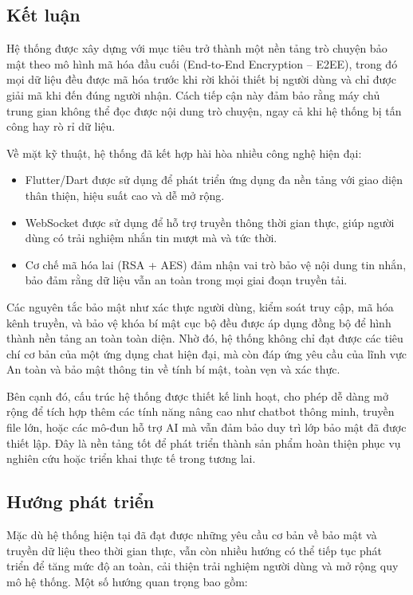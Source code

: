 \setcounter{section}{0}
\renewcommand{\thesubsection}{\arabic{subsection}.}

\subsection{Kết luận}
\hspace*{2em} Hệ thống được xây dựng với mục tiêu trở thành một nền tảng trò chuyện bảo mật theo mô hình mã hóa đầu cuối (End-to-End Encryption – E2EE), trong đó mọi dữ liệu đều được mã hóa trước khi rời khỏi thiết bị người dùng và chỉ được giải mã khi đến đúng người nhận. Cách tiếp cận này đảm bảo rằng máy chủ trung gian không thể đọc được nội dung trò chuyện, ngay cả khi hệ thống bị tấn công hay rò rỉ dữ liệu.

\indent Về mặt kỹ thuật, hệ thống đã kết hợp hài hòa nhiều công nghệ hiện đại:
\begin{itemize}
  \item Flutter/Dart được sử dụng để phát triển ứng dụng đa nền tảng với giao diện thân thiện, hiệu suất cao và dễ mở rộng.
  \item WebSocket được sử dụng để hỗ trợ truyền thông thời gian thực, giúp người dùng có trải nghiệm nhắn tin mượt mà và tức thời.
  \item Cơ chế mã hóa lai (RSA + AES) đảm nhận vai trò bảo vệ nội dung tin nhắn, bảo đảm rằng dữ liệu vẫn an toàn trong mọi giai đoạn truyền tải.

\end{itemize}

\indent Các nguyên tắc bảo mật như xác thực người dùng, kiểm soát truy cập, mã hóa kênh truyền, và bảo vệ khóa bí mật cục bộ đều được áp dụng đồng bộ để hình thành nền tảng an toàn toàn diện. Nhờ đó, hệ thống không chỉ đạt được các tiêu chí cơ bản của một ứng dụng chat hiện đại, mà còn đáp ứng yêu cầu của lĩnh vực An toàn và bảo mật thông tin về tính bí mật, toàn vẹn và xác thực.

\indent Bên cạnh đó, cấu trúc hệ thống được thiết kế linh hoạt, cho phép dễ dàng mở rộng để tích hợp thêm các tính năng nâng cao như chatbot thông minh, truyền file lớn, hoặc các mô-đun hỗ trợ AI mà vẫn đảm bảo duy trì lớp bảo mật đã được thiết lập. Đây là nền tảng tốt để phát triển thành sản phẩm hoàn thiện phục vụ nghiên cứu hoặc triển khai thực tế trong tương lai.

\subsection{Hướng phát triển}
\hspace*{2em} Mặc dù hệ thống hiện tại đã đạt được những yêu cầu cơ bản về bảo mật và truyền dữ liệu theo thời gian thực, vẫn còn nhiều hướng có thể tiếp tục phát triển để tăng mức độ an toàn, cải thiện trải nghiệm người dùng và mở rộng quy mô hệ thống. Một số hướng quan trọng bao gồm:

